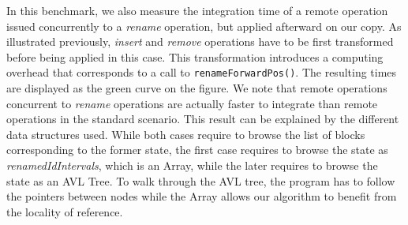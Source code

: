 \documentclass{article}
\theoremstyle{definition}
\begin{document}
In this benchmark, we also measure the integration time of a remote operation issued concurrently to a \emph{rename} operation, but applied afterward on our copy.
As illustrated previously, \emph{insert} and \emph{remove} operations have to be first transformed before being applied in this case.
This transformation introduces a computing overhead that corresponds to a call to \verb|renameForwardPos()|.
The resulting times are displayed as the green curve on the figure.
We note that remote operations concurrent to \emph{rename} operations are actually faster to integrate than remote operations in the standard scenario.
This result can be explained by the different data structures used.
While both cases require to browse the list of blocks corresponding to the former state, the first case requires to browse the state as \emph{renamedIdIntervals}, which is an Array, while the later requires to browse the state as an AVL Tree.
To walk through the AVL tree, the program has to follow the pointers between nodes while the Array allows our algorithm to benefit from the locality of reference.





\end{document}
